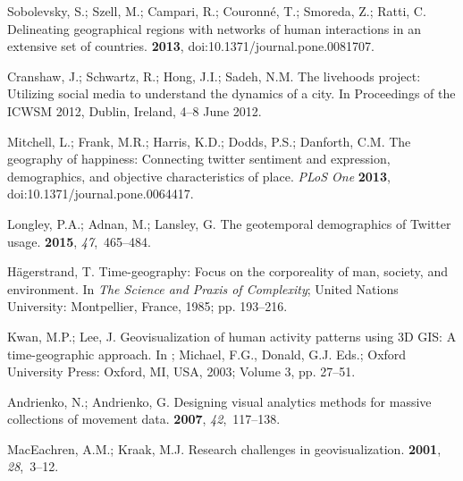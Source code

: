\documentclass[ijgi,article,accept,moreauthors,pdftex,10pt,a4paper]{mdpi}
\theoremstyle{mdpi}
\newcounter{ex}
\newcounter{re}
\theoremstyle{mdpidefinition}
\begin{document}
\begin{thebibliography}{-------}
Sobolevsky, S.; Szell, M.; Campari, R.; Couronn{\'e}, T.; Smoreda, Z.; Ratti,
  C.
\newblock Delineating geographical regions with networks of human interactions
  in an extensive set of countries.
 {\bf 2013}, doi:10.1371/journal.pone.0081707.

Cranshaw, J.; Schwartz, R.; Hong, J.I.; Sadeh, N.M.
\newblock The livehoods project: Utilizing social media to understand the
  dynamics of a city.
\newblock  In Proceedings of the ICWSM 2012, Dublin, Ireland, 4--8 June 2012.

Mitchell, L.; Frank, M.R.; Harris, K.D.; Dodds, P.S.; Danforth, C.M.
\newblock The geography of happiness: Connecting twitter sentiment and
  expression, demographics, and objective characteristics of place. {\em PLoS One} {\bf 2013}, doi:10.1371/journal.pone.0064417.


Longley, P.A.; Adnan, M.; Lansley, G.
\newblock The geotemporal demographics of Twitter usage.
 {\bf 2015}, {\em 47},~465--484.

H{\"a}gerstrand, T.
\newblock Time-geography: Focus on the corporeality of man, society, and
  environment.
\newblock In {\em The Science and Praxis of Complexity}; United Nations University: Montpellier, France, 1985; pp. 193--216.


Kwan, M.P.; Lee, J.
\newblock Geovisualization of human activity patterns using 3D GIS: A
  time-geographic approach. In 
; Michael, F.G., Donald, G.J. Eds.; Oxford University Press: Oxford, MI, USA, 2003; Volume 3, pp. 27--51.

Andrienko, N.; Andrienko, G.
\newblock Designing visual analytics methods for massive collections of
  movement data.
 {\bf 2007}, {\em 42},~117--138.


MacEachren, A.M.; Kraak, M.J.
\newblock Research challenges in geovisualization.
 {\bf 2001}, {\em
  28},~3--12.


\end{thebibliography}
\end{document}
